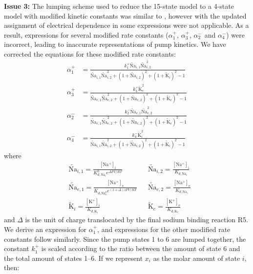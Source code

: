 \documentclass[11pt]{article}
\begin{document}
\textbf{Issue 3:} The lumping scheme used to reduce the 15-state model to a 4-state model with modified kinetic constants was similar to \citet{smith_development_2004}, however with the updated assignment of electrical dependence in \citet{terkildsen_balance_2007} some expressions were not applicable. As a result, expressions for several modified rate constants ($\alpha_1^+$, $\alpha_3^+$, $\alpha_2^-$ and $\alpha_4^-$) were incorrect, leading to inaccurate representations of pump kinetics. We have corrected the equations for these modified rate constants:
\begin{align}
	\alpha_1^+ &= \frac{k_1^+  \tilde{\text{Na}}_{i,1}\tilde{\text{Na}}_{i,2}^2}{\tilde{\text{Na}}_{i,1}\tilde{\text{Na}}_{i,2}^2 + (1 + \tilde{\text{Na}}_{i,2})^2 + (1 + \tilde{\text{K}}_i)^2 -1} \\
	\alpha_3^+ &= \frac{k_3^+ \tilde{\text{K}}_e^{2}}{\tilde{\text{Na}}_{e,1}\tilde{\text{Na}}_{e,2}^2 + (1 + \tilde{\text{Na}}_{e,2})^2 + (1 + \tilde{\text{K}}_e)^2 -1 } \\
	\alpha_2^-&= \frac{k_2^- \tilde{\text{Na}}_{e,1}\tilde{\text{Na}}_{e,2}^2}{\tilde{\text{Na}}_{e,1}\tilde{\text{Na}}_{e,2}^2 + (1 + \tilde{\text{Na}}_{e,2})^2 + (1 + \tilde{\text{K}}_e)^2 -1} \\
	\alpha_4^- &= \frac{k_4^- \tilde{\text{K}}_i^2}{\tilde{\text{Na}}_{i,1}\tilde{\text{Na}}_{i,2}^2 + (1 + \tilde{\text{Na}}_{i,2})^2 + (1 + \tilde{\text{K}}_i)^2 -1}
\end{align}
where
\begin{align}
	&\tilde{\text{Na}}_{i,1} = \frac{\mathrm{[Na^+]_i}}{K_{d,\text{Na}_i}^0 e^{\Delta FV/RT}} 
	&&\tilde{\text{Na}}_{i,2} = \frac{\mathrm{[Na^+]_i}}{K_{d,\text{Na}_i}} \\
	&\tilde{\text{Na}}_{e,1} = \frac{\mathrm{[Na^+]_e}}{K_{d,\text{Na}_e^0} e^{(1+\Delta) zFV/RT}} 
	&&\tilde{\text{Na}}_{e,2} = \frac{\mathrm{[Na^+]_e}}{K_{d,\text{Na}_e}} \\
	&\tilde{\text{K}}_i = \frac{\mathrm{[K^+]_i}}{K_{d,\text{K}_i}} 
	&&\tilde{\text{K}}_e = \frac{\mathrm{[K^+]_e}}{K_{d,\text{K}_e}} 
\end{align}
and $\Delta$ is the unit of charge translocated by the final sodium binding reaction R5. We derive an expression for $\alpha_1^+$, and expressions for the other modified rate constants follow similarly. Since the pump states 1 to 6 are lumped together, the constant $k_1^+$ is scaled according to the ratio between the amount of state 6 and the total amount of states 1--6. If we represent $x_i$ as the molar amount of state $i$, then:
\end{document}
